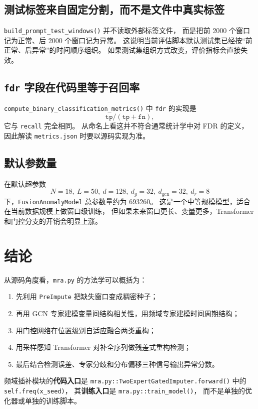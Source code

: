 \documentclass[UTF8,11pt,a4paper]{ctexart}
\begin{document}
\subsection{测试标签来自固定分割，而不是文件中真实标签}

\texttt{build\_prompt\_test\_windows()} 并不读取外部标签文件，
而是把前 2000 个窗口记为正常、后 2000 个窗口记为异常。
这说明当前评估脚本默认测试集已经按“前正常、后异常”的时间顺序组织。
如果测试集组织方式改变，评价指标会直接失效。

\subsection{\texttt{fdr} 字段在代码里等于召回率}

\texttt{compute\_binary\_classification\_metrics()} 中
\texttt{fdr} 的实现是
\[
\texttt{tp}/(\texttt{tp}+\texttt{fn}),
\]
它与 \texttt{recall} 完全相同。
从命名上看这并不符合通常统计学中对 FDR 的定义，
因此解读 \texttt{metrics.json} 时要以源码实现为准。

\subsection{默认参数量}

在默认超参数
\[
N=18,\ L=50,\ d=128,\ d_g=32,\ d_{\mathrm{gcn}}=32,\ d_r=8
\]
下，\texttt{FusionAnomalyModel} 总参数量约为 693260。
这是一个中等规模模型，适合在当前数据规模上做窗口级训练，
但如果未来窗口更长、变量更多，Transformer 和门控分支的开销会明显上涨。

\section{结论}

从源码角度看，\texttt{mra.py} 的方法学可以概括为：
\begin{enumerate}
  \item 先利用 \texttt{PreImpute} 把缺失窗口变成稠密种子；
  \item 再用 GCN 专家建模变量间结构相关性，用频域专家建模时间周期结构；
  \item 用门控网络在位置级别自适应融合两类重构；
  \item 用采样感知 Transformer 对补全序列做残差式重构检测；
  \item 最后结合检测误差、专家分歧和分布偏移三种信号输出异常分数。
\end{enumerate}

频域插补模块的\textbf{代码入口}是
\texttt{mra.py::TwoExpertGatedImputer.forward()} 中的
\texttt{self.freq(x\_seed)}，
其\textbf{训练入口}是 \texttt{mra.py::train\_model()}，
而不是单独的优化器或单独的训练脚本。
\end{document}
